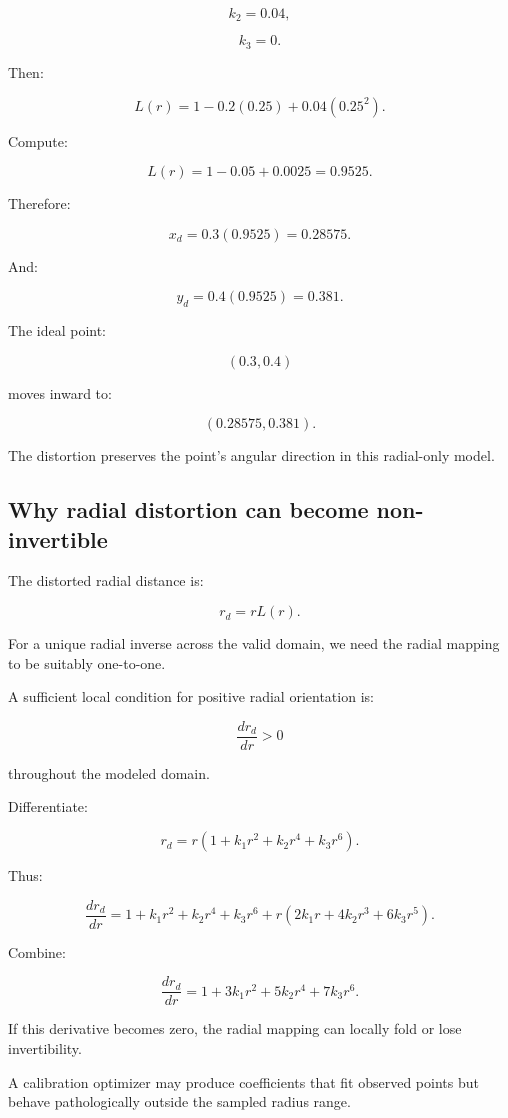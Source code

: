\[
 k_2=0.04,
\]

\[
 k_3=0.
\]

Then:

\[
 L(r)=1-0.2(0.25)+0.04(0.25^2).
\]

Compute:

\[
 L(r)=1-0.05+0.0025 =\boxed{0.9525}.
\]

Therefore:

\[
 x_d=0.3(0.9525) =\boxed{0.28575}.
\]

And:

\[
 y_d=0.4(0.9525) =\boxed{0.381}.
\]

The ideal point:

\[
 (0.3,0.4)
\]

moves inward to:

\[
 \boxed{(0.28575,0.381)}.
\]

The distortion preserves the point's angular direction in this radial-only model.

\subsection{Why radial distortion can become non-invertible}\label{02-foundations-ii-ch035-why-radial-distortion-can-become-non-invertible}

The distorted radial distance is:

\[
 \boxed{ r_d=rL(r) }.
\]

For a unique radial inverse across the valid domain, we need the radial mapping to be suitably one-to-one.

A sufficient local condition for positive radial orientation is:

\[
 \boxed{ \frac{dr_d}{dr}>0 }
\]

throughout the modeled domain.

Differentiate:

\[
 r_d=r(1+k_1r^2+k_2r^4+k_3r^6).
\]

Thus:

\[
 \frac{dr_d}{dr} = 1+k_1r^2+k_2r^4+k_3r^6 +r(2k_1r+4k_2r^3+6k_3r^5).
\]

Combine:

\[
 \boxed{ \frac{dr_d}{dr} = 1+3k_1r^2+5k_2r^4+7k_3r^6 }.
\]

If this derivative becomes zero, the radial mapping can locally fold or lose invertibility.

A calibration optimizer may produce coefficients that fit observed points but behave pathologically outside the sampled radius range.

